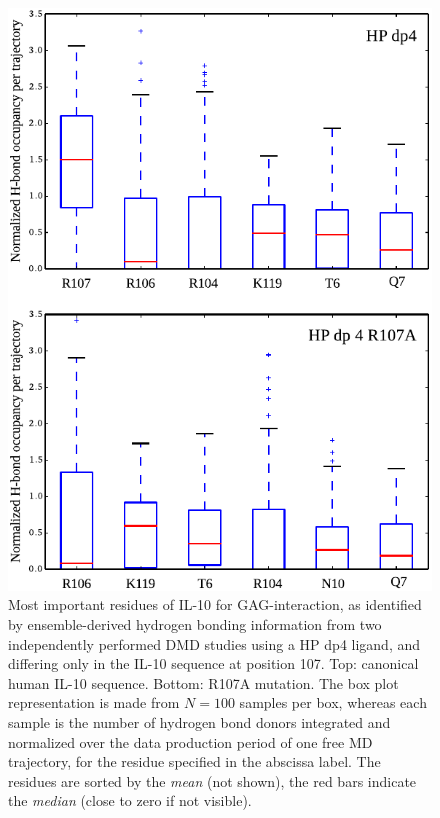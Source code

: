 \begin{figure}
\centering
\includegraphics[width=1.0\textwidth]{gfx/dmdil10/first_stage_Hbonding_hp_dp4_R107A_vs_unmutated.pdf}
\caption[]{Most important residues of IL-10 for GAG-interaction, as identified
by ensemble-derived hydrogen bonding information from two independently
performed DMD studies using a HP dp4 ligand, and differing only in the IL-10
sequence at position 107. Top: canonical human IL-10 sequence. Bottom: R107A
mutation. The box plot representation is made from $N=100$ samples per box,
whereas each sample is the number of hydrogen bond donors integrated and
normalized over the data production period of one free MD trajectory, for the
residue specified in the abscissa label. The residues are sorted by the
\textit{mean} (not shown), the red bars indicate the \textit{median} (close to
zero if not visible).}
\label{fig:dmdil10:hpdp4_normal_vs_R107A}
\end{figure}

